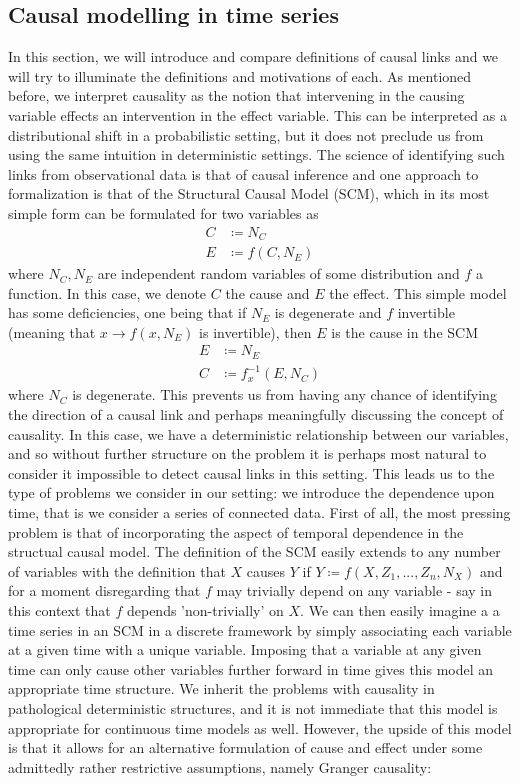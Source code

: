 \documentclass[11pt, a4paper]{memoir}
\begin{document}
\subsection{Causal modelling in time series}
In this section, we will introduce and compare definitions of causal links and we will try to illuminate the definitions and motivations of each. As mentioned before, we interpret causality as the notion that intervening in the causing variable effects an intervention in the effect variable. This can be interpreted as a distributional shift in a probabilistic setting, but it does not preclude us from using the same intuition in deterministic settings. The science of identifying such links from observational data is that of causal inference and one approach to formalization is that of the Structural Causal Model (SCM), which in its most simple form can be formulated for two variables as
\begin{align*}
C&\coloneqq N_C\\
E&\coloneqq f(C,N_E)
\end{align*}
where $N_C,N_E$ are independent random variables of some distribution and $f$ a function. In this case, we denote $C$ the cause and $E$ the effect. This simple model has some deficiencies, one being that if $N_E$ is degenerate and $f$ invertible (meaning that $x\to f(x,N_E)$ is invertible), then $E$ is the cause in the SCM
\begin{align*}
E&\coloneqq N_E\\
C&\coloneqq f_x^{-1}(E,N_C)
\end{align*}
where $N_C$ is degenerate. This prevents us from having any chance of identifying the direction of a causal link and perhaps meaningfully discussing the concept of causality. In this case, we have a deterministic relationship between our variables, and so without further structure on the problem it is perhaps most natural to consider it impossible to detect causal links in this setting. This leads us to the type of problems we consider in our setting: we introduce the dependence upon time, that is we consider a series of connected data. First of all, the most pressing problem is that of incorporating the aspect of temporal dependence in the structual causal model. The definition of the SCM easily extends to any number of variables with the definition that $X$ causes $Y$ if $Y\coloneqq f(X,Z_1,...,Z_n,N_X)$ and for a moment disregarding that $f$ may trivially depend on any variable - say in this context that $f$ depends 'non-trivially' on $X$. We can then easily imagine a a time series in an SCM in a discrete framework by simply associating each variable at a given time with a unique variable. Imposing that a variable at any given time can only cause other variables further forward in time gives this model an appropriate time structure. We inherit the problems with causality in pathological deterministic structures, and it is not immediate that this model is appropriate for continuous time models as well. However, the upside of this model is that it allows for an alternative formulation of cause and effect under some admittedly rather restrictive assumptions, namely Granger causality:\\
\end{document}
